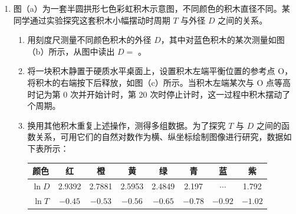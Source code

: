 \documentclass[\gkver]{gaokaozhenti}
\begin{document}
\begin{enumerate}
{$U = E - \frac{US}{\rho L}r$

联立可得

整理可得 $\frac{1}{U} = \frac{1}{E} + \frac{Sr}{E\rho} \cdot \frac{1}{L}$

对于电路图（b），根据闭合电路欧姆定律有 $U = E - I(r + R_{0})$

结合欧姆定律和电阻定律 $I = \frac{U}{R}$，$R = \rho \frac{L}{S}$

联立后整理 $\frac{1}{U} = \frac{1}{E} + \frac{S(r + R_{0})}{E\rho} \cdot \frac{1}{L}$

可知图线的纵轴截距 $b = \frac{1}{E}$

解得 $E = \frac{1}{b}$

（3）由题意可知

$k_{1} = \frac{Sr}{E\rho}$

$k_{2} = \frac{S(r + R_{0})}{E\rho}$

又 $\frac{k_{2}}{k_{1}} = n$

联立解得 $r = \frac{R_{0}}{n - 1}$
}

\item
图（a）为一套半圆拱形七色彩虹积木示意图，不同颜色的积木直径不同。某同学通过实验探究这套积木小幅摆动时周期 $T$ 与外径 $D$ 之间的关系。
\begin{enumerate}
	\item
	用刻度尺测量不同颜色积木的外径 $D$，其中对蓝色积木的某次测量如图（b）所示，从图中读出 $D = $ \tkanswer{$7.55 \Ucm$}。
	\item
	将一块积木静置于硬质水平桌面上，设置积木左端平衡位置的参考点 O，将积木的右端按下后释放，如图（c）所示。当积木左端某次与 O 点等高时记为第 0 次并开始计时，第 20 次时停止计时，这一过程中积木摆动了  个周期。
	\item
	换用其他积木重复上述操作，测得多组数据。为了探究 $T$ 与 $D$ 之间的函数关系，可用它们的自然对数作为横、纵坐标绘制图像进行研究，数据如下表所示：
	\begin{center}
	\begin{tabular}{|c|c|c|c|c|c|c|c|}
	\hline
	颜色 & 红 & 橙 & 黄 & 绿 & 青 & 蓝 & 紫 \\
	\hline
	$\ln D$ & 2.9392 & 2.7881 & 2.5953 & 2.4849 & 2.197 & $\cdots$ & 1.792 \\
	\hline
	$\ln T$ & $-0.45$ & $-0.53$ & $-0.56$ & $-0.65$ & $-0.78$ & $-0.92$ & $-1.02$ \\
	\hline
	\end{tabular}
	\end{center}


\end{enumerate}
\end{enumerate}
\end{document}
